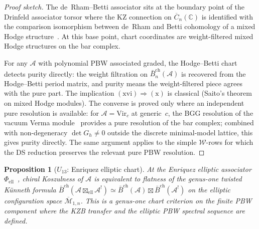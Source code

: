\documentclass[11pt,reqno]{amsart}
\newtheorem{proposition}[theorem]{Proposition}
\theoremstyle{definition}
\theoremstyle{remark}
\newcommand{\cA}{\mathcal{A}}
\newcommand{\cM}{\mathcal{M}}
\newcommand{\cW}{\mathcal{W}}
\newcommand{\barBch}{\bar{B}^{\mathrm{ch}}}
\newcommand{\FM}{\overline{C}}
\newcommand{\Vir}{\mathrm{Vir}}
\newcommand{\bC}{\mathbb{C}}
\numberwithin{equation}{section}
\begin{document}
\begin{proof}[Proof sketch]
The de~Rham--Betti associator sits at the boundary point of the
Drinfeld associator torsor where the KZ connection on
$\FM_n(\bC)$ is identified with the comparison isomorphism
between de~Rham and Betti cohomology of a mixed Hodge
structure~\cite{Deligne89}. At this base point, chart
coordinates are weight-filtered mixed Hodge structures on the
bar complex.

For any $\cA$ with polynomial PBW associated graded, the
Hodge--Betti chart detects purity directly: the weight filtration
on $\barBch_n(\cA)$ is recovered from the Hodge--Betti period
matrix, and purity means the weight-filtered piece agrees with
the pure part. The implication
$(\mathrm{xvi}) \Rightarrow (\mathrm{x})$ is classical
(Saito's theorem on mixed Hodge modules). The converse is proved
only where an independent pure resolution is available:
for $\cA = \Vir_c$ at generic~$c$, the BGG resolution of the
vacuum Verma module~\cite{FeiginFuchs90,RCW82}
provides a pure resolution of the bar complex; combined with
non-degeneracy $\det G_h \neq 0$ outside the discrete
minimal-model lattice, this gives purity directly. The same
argument applies to the simple $\cW$-rows for which the DS
reduction preserves the relevant pure PBW resolution.
\end{proof}

\begin{proposition}[$U_{13}$: Enriquez elliptic chart]
\label{prop:elliptic-chart}
At the Enriquez elliptic associator
$\Phi_{\mathrm{ell}}$~\cite{Enriquez14}, chiral Koszulness of
$\cA$ is equivalent to flatness of the genus-one twisted
K\"unneth formula
$\barBch(\cA \boxtimes_{\mathrm{ell}} \cA^!) \simeq
 \barBch(\cA) \boxtimes \barBch(\cA^!)$
on the elliptic configuration space $\overline{\cM}_{1,n}$.
This is a genus-one chart criterion on the finite PBW component
where the KZB transfer and the elliptic PBW spectral sequence are
defined.
\end{proposition}
\end{document}
